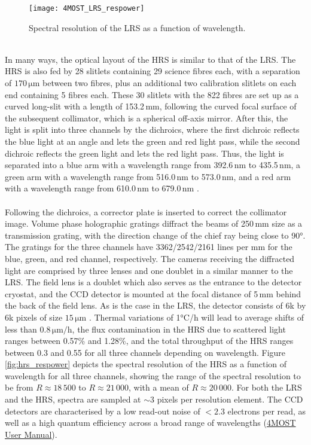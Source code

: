 \documentclass[a4paper,11pt]{article}
\begin{document}
%
\begin{figure}[h]
 \centering
 \texttt{[image: 4MOST\_LRS\_respower]}
 \caption[Spectral resolution of the LRS]{Spectral resolution of the LRS as a function of wavelength.\footnotemark[5]}
 \label{fig:lrs_respower}
\end{figure}\\
%
In many ways, the optical layout of the HRS is similar to that of the LRS. The HRS is also fed by 28 slitlets containing 29 science fibres each, with a separation of $170\,\mathrm{\mu m}$ between two fibres, plus an additional two calibration slitlets on each end containing 5 fibres each. These 30 slitlets with the 822 fibres are set up as a curved long-slit with a length of 153.2\,mm, following the curved focal surface of the subsequent collimator, which is a spherical off-axis mirror. After this, the light is split into three channels by the dichroics, where the first dichroic reflects the blue light at an angle and lets the green and red light pass, while the second dichroic reflects the green light and lets the red light pass. Thus, the light is separated into a blue arm with a wavelength range from 392.6\,nm to 435.5\,nm, a green arm with a wavelength range from 516.0\,nm to 573.0\,nm, and a red arm with a wavelength range from 610.0\,nm to 679.0\,nm \citep{seifert16}.\\ \\
%
Following the dichroics, a corrector plate is inserted to correct the collimator image. Volume phase holographic gratings diffract the beams of 250\,mm size as a transmission grating, with the direction change of the chief ray being close to 90°. The gratings for the three channels have 3362/2542/2161 lines per mm for the blue, green, and red channel, respectively. The cameras receiving the diffracted light are comprised by three lenses and one doublet in a similar manner to the LRS. The field lens is a doublet which also serves as the entrance to the detector cryostat, and the CCD detector is mounted at the focal distance of 5\,mm behind the back of the field lens. As is the case in the LRS, the detector consists of 6k by 6k pixels of size $15\,\mathrm{\mu m}$ \citep{seifert16}. Thermal variations of 1°C/h will lead to average shifts of less than $0.8\,\mathrm{\mu m/h}$, the flux contamination in the HRS due to scattered light ranges between 0.57\% and 1.28\%, and the total throughput of the HRS ranges between 0.3 and 0.55 for all three channels depending on wavelength. Figure \ref{fig:hrs_respower} depicts the spectral resolution of the HRS as a function of wavelength for all three channels, showing the range of the spectral resolution to be from $R\approx18\,500$ to $R\approx21\,000$, with a mean of $R\approx20\,000$. For both the LRS and the HRS, spectra are sampled at ${\sim}3$ pixels per resolution element. The CCD detectors are characterised by a low read-out noise of $<2.3$ electrons per read, as well as a high quantum efficiency across a broad range of wavelengths (\href{https://www.4most.eu/cms/files/VIS-MAN-4MOST-47110-9800-0001_2_00-4MOST-User-Manual.pdf}{4MOST User Manual}).
\end{document}
